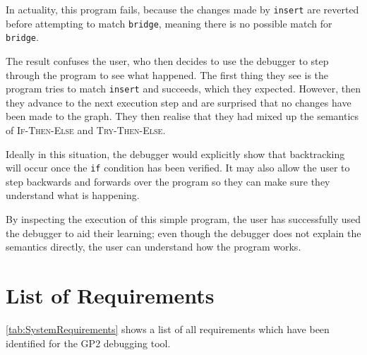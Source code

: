 \documentclass[authoryearcitations]{UoYCSproject}
\begin{document}
In actuality, this program fails, because the changes made by \texttt{insert}
are reverted before attempting to match \texttt{bridge}, meaning there is no
possible match for \texttt{bridge}.

The result confuses the user, who then decides to use the debugger to step
through the program to see what happened. The first thing they see is the
program tries to match \texttt{insert} and succeeds, which they expected.
However, then they advance to the next execution step and are surprised that
no changes have been made to the graph. They then realise that they had mixed
up the semantics of \textsc{If-Then-Else} and \textsc{Try-Then-Else}.

Ideally in this situation, the debugger would explicitly show that backtracking
will occur once the \texttt{if} condition has been verified. It may also allow
the user to step backwards and forwards over the program so they can make sure
they understand what is happening.

By inspecting the execution of this simple program, the user has successfully
used the debugger to aid their learning; even though the debugger does not
explain the semantics directly, the user can understand how the program works.


\section{List of Requirements}
\label{sec:ListOfRequirements}

\autoref{tab:SystemRequirements} shows a list of all requirements which have
been identified for the GP2 debugging tool.
\end{document}
